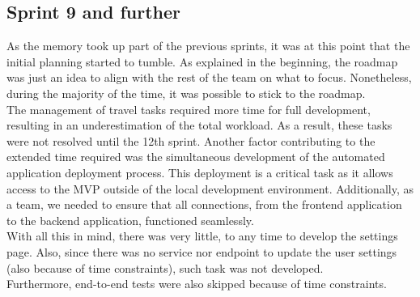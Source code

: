 \documentclass[../memory.tex]{subfiles}
\begin{document}
\subsection{Sprint 9 and further}
As the memory took up part of the previous sprints, it was at this point that
the initial planning started to tumble. As explained in the beginning, the
roadmap was just an idea to align with the rest of the team on what to focus.
Nonetheless, during the majority of the time, it was possible to stick to the
roadmap.
\\[8pt]
The management of travel tasks required more time for full development,
resulting in an underestimation of the total workload. As a result, these tasks
were not resolved until the 12th sprint. Another factor contributing to the
extended time required was the simultaneous development of the automated
application deployment process. This deployment is a critical task as it allows
access to the MVP outside of the local development environment. Additionally, as
a team, we needed to ensure that all connections, from the frontend application
to the backend application, functioned seamlessly.
\\[8pt]
With all this in mind, there was very little, to any time to develop the
settings page. Also, since there was no service nor endpoint to update the user
settings (also because of time constraints), such task was not developed.
\\
Furthermore, end-to-end tests were also skipped because of time constraints.
\end{document}
